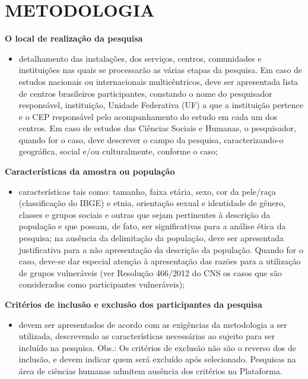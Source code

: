 \documentclass[
  brazilian,
  12pt,
  letterpaper,
  DIV=11,
  numbers=noendperiod]{scrartcl}
\providecommand{\tightlist}{%
  \setlength{\itemsep}{0pt}\setlength{\parskip}{0pt}}
\begin{document}
\section{METODOLOGIA}\label{metodologia}

\textbf{O local de realização da pesquisa}

\begin{itemize}
\tightlist
\item
  detalhamento das instalações, dos serviços, centros, comunidades e
  instituições nas quais se processarão as várias etapas da pesquisa. Em
  caso de estudos nacionais ou internacionais multicêntricos, deve ser
  apresentada lista de centros brasileiros participantes, constando o
  nome do pesquisador responsável, instituição, Unidade Federativa (UF)
  a que a instituição pertence e o CEP responsável pelo acompanhamento
  do estudo em cada um dos centros. Em caso de estudos das Ciências
  Sociais e Humanas, o pesquisador, quando for o caso, deve descrever o
  campo da pesquisa, caracterizando-o geográfica, social e/ou
  culturalmente, conforme o caso;
\end{itemize}

\textbf{Características da amostra ou população}

\begin{itemize}
\tightlist
\item
  características tais como: tamanho, faixa etária, sexo, cor da
  pele/raça (classificação do IBGE) e etnia, orientação sexual e
  identidade de gênero, classes e grupos sociais e outras que sejam
  pertinentes à descrição da população e que possam, de fato, ser
  significativas para a análise ética da pesquisa; na ausência da
  delimitação da população, deve ser apresentada justificativa para a
  não apresentação da descrição da população. Quando for o caso, deve-se
  dar especial atenção à apresentação das razões para a utilização de
  grupos vulneráveis (ver Resolução 466/2012 do CNS os casos que são
  considerados como participantes vulneráveis);
\end{itemize}

\textbf{Critérios de inclusão e exclusão dos participantes da pesquisa}

\begin{itemize}
\tightlist
\item
  devem ser apresentados de acordo com as exigências da metodologia a
  ser utilizada, descrevendo as características necessárias ao sujeito
  para ser incluído na pesquisa. Obs.: Os critérios de exclusão não são
  o reverso dos de inclusão, e devem indicar quem será excluído após
  selecionado. Pesquisas na área de ciências humanas admitem ausência
  dos critérios na Plataforma.
\end{itemize}
\end{document}
